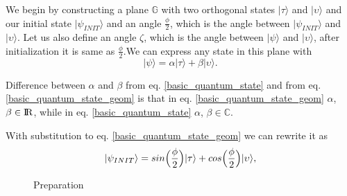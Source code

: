 We begin by constructing a plane $\mathbb{G}$ with two orthogonal states $|\tau\rangle$ and $|\upsilon\rangle$ and our initial state $|\psi_{INIT} \rangle$ and an angle $\frac{\phi}{2}$, which is the angle between $|\psi_{INIT} \rangle$ and $|\upsilon\rangle.$ Let us also define an angle $\zeta$, which is the angle between $|\psi\rangle$ and $|\upsilon\rangle$, after initialization it is same as $\frac{\phi}{2}$.We can express any state in this plane with
\begin{equation} \label{basic_quantum_state_geom}
    |\psi\rangle = \alpha |\tau \rangle  + \beta|\upsilon\rangle.
\end{equation}

Difference between $\alpha$ and $\beta$ from eq. \ref{basic_quantum_state} and from eq. \ref{basic_quantum_state_geom} is that in eq. \ref{basic_quantum_state_geom} $\alpha$, $\beta \in{\rm I\!R}$, while in eq. \ref{basic_quantum_state} $\alpha$, $\beta \in \mathbb{C}$.

With substitution to eq. \ref{basic_quantum_state_geom} we can rewrite it as
\begin{equation}
    |\psi_{INIT}\rangle = sin\Bigl(\frac{\phi}{2}\Bigr)|\tau \rangle  + cos\Bigl(\frac{\phi}{2}\Bigr)|\upsilon\rangle,
\end{equation}

\begin{figure}[h]
\begin{center}
\caption{Preparation} \label{GA_prep}
\end{center}
\end{figure}


